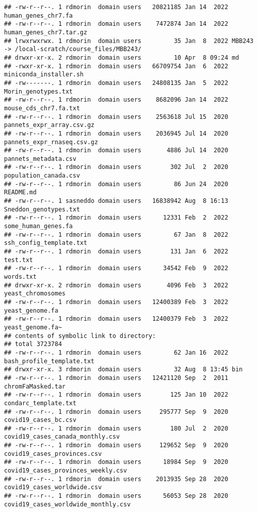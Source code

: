 \documentclass[
]{article}
\begin{document}
\begin{verbatim}
## -rw-r--r--. 1 rdmorin  domain users   20821185 Jan 14  2022 human_genes_chr7.fa
## -rw-r--r--. 1 rdmorin  domain users    7472874 Jan 14  2022 human_genes_chr7.tar.gz
## lrwxrwxrwx. 1 rdmorin  domain users         35 Jan  8  2022 MBB243 -> /local-scratch/course_files/MBB243/
## drwxr-xr-x. 2 rdmorin  domain users         10 Apr  8 09:24 md
## -rwxr-xr-x. 1 rdmorin  domain users   66709754 Jan  6  2022 miniconda_installer.sh
## -rw-------. 1 rdmorin  domain users   24808135 Jan  5  2022 Morin_genotypes.txt
## -rw-r--r--. 1 rdmorin  domain users    8682096 Jan 14  2022 mouse_cds_chr7.fa.txt
## -rw-r--r--. 1 rdmorin  domain users    2563618 Jul 15  2020 pannets_expr_array.csv.gz
## -rw-r--r--. 1 rdmorin  domain users    2036945 Jul 14  2020 pannets_expr_rnaseq.csv.gz
## -rw-r--r--. 1 rdmorin  domain users       4886 Jul 14  2020 pannets_metadata.csv
## -rw-r--r--. 1 rdmorin  domain users        302 Jul  2  2020 population_canada.csv
## -rw-r--r--. 1 rdmorin  domain users         86 Jun 24  2020 README.md
## -rw-r--r--. 1 sasneddo domain users   16838942 Aug  8 16:13 Sneddon_genotypes.txt
## -rw-r--r--. 1 rdmorin  domain users      12331 Feb  2  2022 some_human_genes.fa
## -rw-r--r--. 1 rdmorin  domain users         67 Jan  8  2022 ssh_config_template.txt
## -rw-r--r--. 1 rdmorin  domain users        131 Jan  6  2022 test.txt
## -rw-r--r--. 1 rdmorin  domain users      34542 Feb  9  2022 words.txt
## drwxr-xr-x. 2 rdmorin  domain users       4096 Feb  3  2022 yeast_chromosomes
## -rw-r--r--. 1 rdmorin  domain users   12400389 Feb  3  2022 yeast_genome.fa
## -rw-r--r--. 1 rdmorin  domain users   12400379 Feb  3  2022 yeast_genome.fa~
## contents of symbolic link to directory:
## total 3723784
## -rw-r--r--. 1 rdmorin  domain users         62 Jan 16  2022 bash_profile_template.txt
## drwxr-xr-x. 3 rdmorin  domain users         32 Aug  8 13:45 bin
## -rw-r--r--. 1 rdmorin  domain users   12421120 Sep  2  2011 chromFaMasked.tar
## -rw-r--r--. 1 rdmorin  domain users        125 Jan 10  2022 condarc_template.txt
## -rw-r--r--. 1 rdmorin  domain users     295777 Sep  9  2020 covid19_cases_bc.csv
## -rw-r--r--. 1 rdmorin  domain users        180 Jul  2  2020 covid19_cases_canada_monthly.csv
## -rw-r--r--. 1 rdmorin  domain users     129652 Sep  9  2020 covid19_cases_provinces.csv
## -rw-r--r--. 1 rdmorin  domain users      18984 Sep  9  2020 covid19_cases_provinces_weekly.csv
## -rw-r--r--. 1 rdmorin  domain users    2013935 Sep 28  2020 covid19_cases_worldwide.csv
## -rw-r--r--. 1 rdmorin  domain users      56053 Sep 28  2020 covid19_cases_worldwide_monthly.csv

\end{verbatim}
\end{document}
